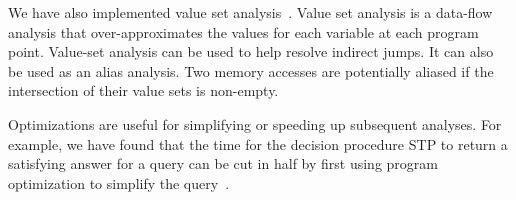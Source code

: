 We have also implemented value set
analysis~\cite{balakrishnan:2007}. Value set analysis is a data-flow
analysis that over-approximates the values for each variable at each
program point. Value-set analysis can be used to help resolve indirect
jumps. It can also be used as an alias analysis.  Two memory accesses
are potentially aliased if the intersection of their value sets is
non-empty.


Optimizations are useful for simplifying or speeding up subsequent
analyses. For example, we have found that the time for the decision
procedure STP to return a satisfying answer for a query can be cut in
half by first using program optimization to simplify the
query~\cite{brumley:2008}.

